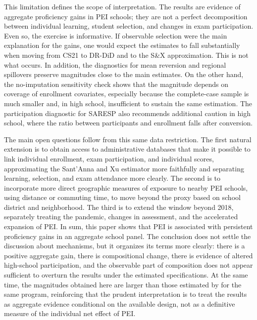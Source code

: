This limitation defines the scope of interpretation. The results are evidence of aggregate proficiency gains in PEI schools; they are not a perfect decomposition between individual learning, student selection, and changes in exam participation. Even so, the exercise is informative. If observable selection were the main explanation for the gains, one would expect the estimates to fall substantially when moving from CS21 to DR-DiD and to the S\&X approximation. This is not what occurs. In addition, the diagnostics for mean reversion and regional spillovers preserve magnitudes close to the main estimates. On the other hand, the no-imputation sensitivity check shows that the magnitude depends on coverage of enrollment covariates, especially because the complete-case sample is much smaller and, in high school, insufficient to sustain the same estimation. The participation diagnostic for SARESP also recommends additional caution in high school, where the ratio between participants and enrollment falls after conversion.

The main open questions follow from this same data restriction. The first natural extension is to obtain access to administrative databases that make it possible to link individual enrollment, exam participation, and individual scores, approximating the Sant'Anna and Xu estimator more faithfully and separating learning, selection, and exam attendance more clearly. The second is to incorporate more direct geographic measures of exposure to nearby PEI schools, using distance or commuting time, to move beyond the proxy based on school district and neighborhood. The third is to extend the window beyond 2018, separately treating the pandemic, changes in assessment, and the accelerated expansion of PEI. In sum, this paper shows that PEI is associated with persistent proficiency gains in an aggregate school panel. The conclusion does not settle the discussion about mechanisms, but it organizes its terms more clearly: there is a positive aggregate gain, there is compositional change, there is evidence of altered high-school participation, and the observable part of composition does not appear sufficient to overturn the results under the estimated specifications. At the same time, the magnitudes obtained here are larger than those estimated by \textcite{scorzafave2023} for the same program, reinforcing that the prudent interpretation is to treat the results as aggregate evidence conditional on the available design, not as a definitive measure of the individual net effect of PEI.
